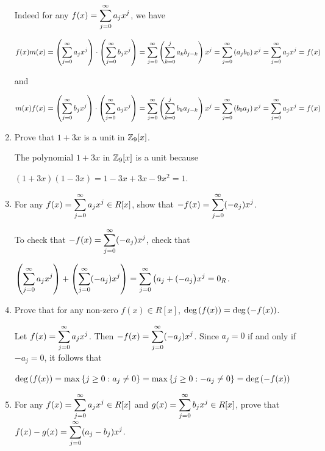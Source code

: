 \documentclass[11pt,fleqn,dvipsnames,usenames]{article}
\begin{document}
\begin{enumerate}[1.]
Indeed for any $f(x) = \displaystyle\sum\limits_{j=0}^{\infty}a_{j}x^{j}$, we have
\begin{center}
$f(x)m(x) = \left(\displaystyle\sum\limits_{j=0}^{\infty}a_{j}x^{j}\right) \cdot \left(\displaystyle\sum\limits_{j=0}^{\infty}b_{j}x^{j}\right) = \displaystyle\sum\limits_{j=0}^{\infty}\left(\displaystyle\sum\limits_{k=0}^{j}a_{k}b_{j-k}\right)x^{j} = \displaystyle\sum\limits_{j=0}^{\infty}\left(a_{j}b_{0}\right)x^{j} = \displaystyle\sum\limits_{j=0}^{\infty}a_{j}x^{j} = f(x)$
\end{center}
and
\begin{center}
$m(x)f(x) = \left(\displaystyle\sum\limits_{j=0}^{\infty}b_{j}x^{j}\right) \cdot \left(\displaystyle\sum\limits_{j=0}^{\infty}a_{j}x^{j}\right) = \displaystyle\sum\limits_{j=0}^{\infty}\left(\displaystyle\sum\limits_{k=0}^{j}b_{k}a_{j-k}\right)x^{j} = \displaystyle\sum\limits_{j=0}^{\infty}\left(b_{0}a_{j}\right)x^{j} = \displaystyle\sum\limits_{j=0}^{\infty}a_{j}x^{j} = f(x)$
\end{center}

\item Prove that $1+3x$ is a unit in $\mathbb{Z}_{9}[x]$.
\vsmsp

\solution The polynomial $1 + 3x$ in $\mathbb{Z}_9[x]$ is a unit because
\begin{center}
$(1 + 3x)(1 - 3x) = 1 - 3x + 3x - 9x^2 = 1$.
\end{center}

\item For any $f(x)=\displaystyle\sum\limits_{j=0}^{\infty}a_{j}x^{j}\in R[x]$, show that $-f(x) = \displaystyle\sum\limits_{j=0}^{\infty}(-a_{j})x^{j}$.
\vsmsp

\solution To check that $-f(x) = \displaystyle\sum\limits_{j=0}^{\infty}(-a_{j})x^{j}$, check that
\begin{center}
$\left(\displaystyle\sum\limits_{j=0}^{\infty}a_{j}x^{j}\right) + \left(\displaystyle\sum\limits_{j=0}^{\infty}(-a_{j})x^{j}\right) = \displaystyle\sum\limits_{j=0}^{\infty}\big(a_{j} + (-a_{j}\big)x^{j} = 0_{R}$.
\end{center}

\item Prove that for any non-zero $f(x)\in R[x]$, $\text{deg}\left(f(x)\right) = \text{deg}\left(-f(x)\right)$.
\vsmsp

\solution Let $f(x) = \displaystyle\sum\limits_{j=0}^{\infty}a_{j}x^{j}$.  Then $-f(x) = \displaystyle\sum\limits_{j=0}^{\infty}(-a_{j})x^{j}$.  Since $a_{j} = 0$ if and only if $-a_{j} = 0$, it follows that
\begin{center}
$\text{deg}\left(f(x)\right) = \max\left\{j\geq 0:a_{j}\neq 0\right\} = \max\left\{j\geq 0:-a_{j}\neq 0\right\} = \text{deg}\left(-f(x)\right)$
\end{center}

\item For any $f(x)=\displaystyle\sum\limits_{j=0}^{\infty}a_{j}x^{j}\in R[x]$ and $g(x)=\displaystyle\sum\limits_{j=0}^{\infty}b_{j}x^{j}\in R[x]$, prove that $f(x) - g(x) = \displaystyle\sum\limits_{j=0}^{\infty}(a_{j}-b_{j})x^{j}$.
\vsmsp


\end{enumerate}
\end{document}
